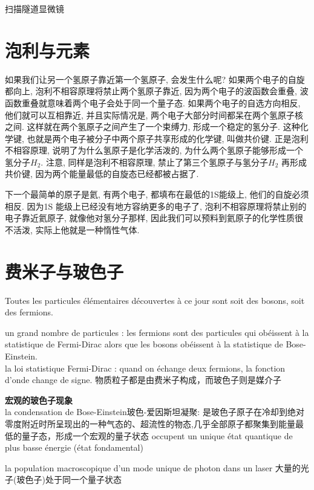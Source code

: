 \documentclass[openany]{book}
\begin{document}
扫描隧道显微镜

\section{泡利与元素}
如果我们让另一个氢原子靠近第一个氢原子, 会发生什么呢? 如果两个电子的自旋都向上, 泡利不相容原理将禁止两个氢原子靠近, 因为两个电子的波函数会重叠, 波函数重叠就意味着两个电子会处于同一个量子态. 如果两个电子的自选方向相反, 他们就可以互相靠近, 并且实际情况是, 两个电子大部分时间都呆在两个氢原子核之间. 这样就在两个氢原子之间产生了一个束缚力, 形成一个稳定的氢分子. 这种化学键, 也就是两个电子被分子中两个原子共享形成的化学键, 叫做共价键. 正是泡利不相容原理, 说明了为什么氢原子是化学活泼的, 为什么两个氢原子能够形成一个氢分子$H_2$. 注意, 同样是泡利不相容原理, 禁止了第三个氢原子与氢分子$H_2$ 再形成共价键, 因为两个能量最低的自旋态已经都被占据了.\par
下一个最简单的原子是氦, 有两个电子, 都填布在最低的1S能级上, 他们的自旋必须相反. 因为1S 能级上已经没有地方容纳更多的电子了, 泡利不相容原理将禁止别的电子靠近氦原子, 就像他对氢分子那样, 因此我们可以预料到氦原子的化学性质很不活泼, 实际上他就是一种惰性气体.

\section{费米子与玻色子}
Toutes les particules élémentaires découvertes à ce jour sont soit des bosons, soit des fermions.\par

un grand nombre de particules : les fermions sont des particules qui obéissent à la statistique de Fermi-Dirac alors que les bosons obéissent à la statistique de Bose-Einstein.\\
la loi statistique Fermi-Dirac : quand on échange deux fermions, la fonction d'onde change de signe.
物质粒子都是由费米子构成，而玻色子则是媒介子

\textbf{宏观的玻色子现象}\\
la condensation de Bose-Einstein玻色-爱因斯坦凝聚: 是玻色子原子在冷却到绝对零度附近时所呈现出的一种气态的、超流性的物态,几乎全部原子都聚集到能量最低的量子态，形成一个宏观的量子状态  occupent un unique état quantique de plus basse énergie (état fondamental)\par
la population macroscopique d'un mode unique de photon dans un laser
大量的光子(玻色子)处于同一个量子状态 \par
\end{document}
